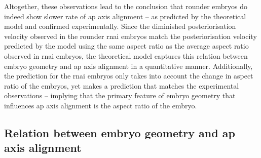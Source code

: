 Altogether, these observations lead to the conclusion that rounder embryos do indeed show slower rate of \ac{ap} axis alignment -- as predicted by the theoretical model and confirmed experimentally. Since the diminished posteriorisation velocity observed in the rounder  \ac{rnai} embryos match the posteriorisation velocity predicted by the model using the same aspect ratio as the average aspect ratio observed in  \ac{rnai} embryos, the theoretical model captures this relation between embryo geometry and \ac{ap} axis alignment in a quantitative manner. Additionally, the prediction for the  \ac{rnai} embryos only takes into account the change in aspect ratio of the embryos, yet makes a prediction that matches the experimental observations -- implying that the primary feature of embryo geometry that influences \ac{ap} axis alignment is the aspect ratio of the embryo.

\FloatBarrier
\subsection{Relation between embryo geometry and \acs{ap} axis alignment}\label{subsec:postVelVsAspectRatio}

